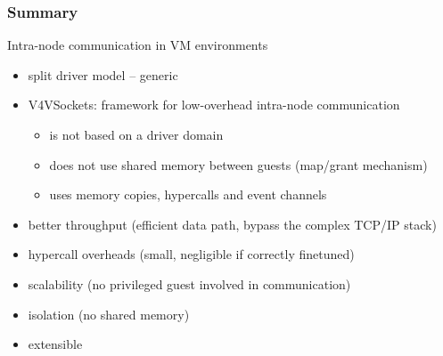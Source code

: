 \documentclass[red,slidestop,notes,compress,mathserif]{beamer}
\begin{document}
\begin{frame}
\frametitle{Summary}
\begin{block}{Intra-node communication in VM environments}
\begin{itemize}
\item split driver model -- generic
\item V4VSockets: framework for low-overhead intra-node communication
\begin{itemize}
\item is not based on a driver domain
\item does not use shared memory between guests (map/grant mechanism)
\item uses memory copies, hypercalls and event channels
\end{itemize}
\end{itemize}
\end{block}
\begin{itemize}
\item better throughput (efficient data path, bypass the complex TCP/IP stack)
\item hypercall overheads (small, negligible if correctly finetuned)
\item scalability (no privileged guest involved in communication)
\item isolation (no shared memory)
\item extensible %
\end{itemize}
\end{frame}
\end{document}
